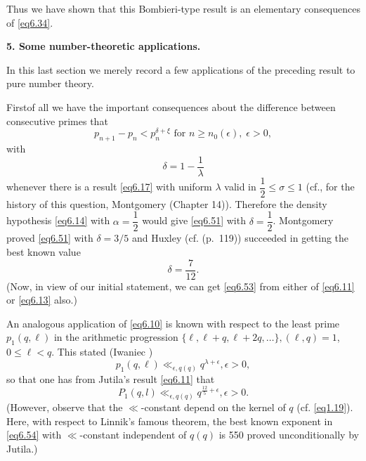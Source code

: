 Thus we have shown that this Bombieri-type result is an elementary
consequences of \eqref{eq6.34}.   

\medskip
\noindent
{\bf 5. Some number-theoretic applications.} 
\smallskip

In this last section we merely record a few applications of the
preceding result to pure number theory. 

First\pageoriginale of all we have the important consequences about
the difference between consecutive primes that  
\begin{equation*}
p_{n+1} - p_n < p_n^{\delta + \xi} \text{ for } n\geq n_0 (\epsilon),
\; \epsilon >
0, \tag{6.51}\label{eq6.51} 
\end{equation*} 
with
\begin{equation*}
\delta = 1-\frac{1}{\lambda} \tag{6.52}\label{eq6.52} 
\end{equation*}
whenever there is a result \eqref{eq6.17} with uniform $\lambda$ valid in
$\dfrac{1}{2} \leq \sigma \leq 1$ (cf., for the history of this
question, Montgomery \cite{key5} (Chapter 14)). Therefore the density
hypothesis \eqref{eq6.14} with $\alpha = \dfrac{1}{2}$ would give
\eqref{eq6.51} 
with $\delta =\dfrac{1}{2}$. Montgomery \cite{key3} proved \eqref{eq6.51} with
$\delta =3/5$ and Huxley \cite{key8} (cf. \cite{key7} (p.~119))
succeeded in getting the best known value 
\begin{equation*}
\delta = \frac{7}{12}. \tag{6.53}\label{eq6.53}
\end{equation*}
(Now, in view of our initial statement, we can get \eqref{eq6.53} from
either of \eqref{eq6.11} or \eqref{eq6.13} also.) 

An analogous application of \eqref{eq6.10} is known with respect to the
least prime $p_1(q,\ell)$ in the arithmetic progression $\{\ell,
\ell+q, \ell+2q, \ldots \}, (\ell,q) = 1$, $0 \leq\ell < q$. This
stated (Iwaniec \cite{key4})   
\begin{equation*}
p_1(q,\ell) \ll_{\epsilon , q(q)} q^{\lambda +\epsilon}, \epsilon > 0,
\tag{6.54}\label{eq6.54} 
\end{equation*}         
so that one has from Jutila's result \eqref{eq6.11} that
\begin{equation*}
P_1(q,l) \ll_{\epsilon ,q(q)}  q^{\frac{12}{5} + \epsilon},\epsilon >
0. \tag{6.55}\label{eq6.55} 
\end{equation*}
(However, observe that the $\ll$-constant depend on the kernel of $q$
(cf. \eqref{eq1.19}). Here, with respect to Linnik's famous theorem,
the best known exponent in \eqref{eq6.54} with $\ll$-constant
independent of $q(q)$ is 550 proved unconditionally by Jutila.) 

